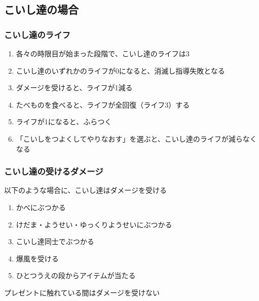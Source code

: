 \subsection{こいし達の場合}

\subsubsection{こいし達のライフ}
\begin{enumerate}[label={\sarrow}]
\item 各々の時限目が始まった段階で、こいし達のライフは3
\item こいし達のいずれかのライフが0になると、消滅し指導失敗となる
\item ダメージを受けると、ライフが1減る
\item たべものを食べると、ライフが全回復（ライフ3）する
\item ライフが1になると、ふらつく
\item 「こいしをつよくしてやりなおす」を選ぶと、こいし達のライフが減らなくなる
\end{enumerate}

\subsubsection{こいし達の受けるダメージ}
以下のような場合に、こいし達はダメージを受ける
\begin{enumerate}[label={\sarrow}]
\item かべにぶつかる
\item けだま・ようせい・ゆっくりようせいにぶつかる
\item こいし達同士でぶつかる
\item 爆風を受ける
\item ひとつうえの段からアイテムが当たる
\end{enumerate}
\begin{marker}
プレゼントに触れている間はダメージを受けない
\end{marker}


